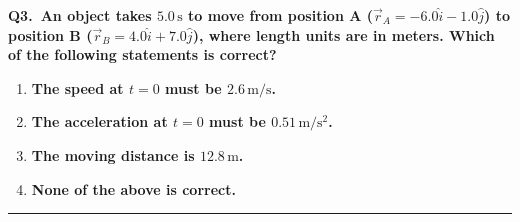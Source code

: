\documentclass[11pt]{article}
\newcommand{\QuestionStyle}[1]{{\large\bfseries\boldmath #1}}
\newcommand{\AnswerStyle}[1]{{\large\bfseries\boldmath #1}}
\newcommand{\ReasonStyle}[1]{{\normalsize #1}}
\newif\ifshowreason
\newcommand{\Correct}[2]{%
  \item \AnswerStyle{\textcolor{AnsRed}{#1}}%
  \ifshowreason\\[-0.2em]
    \ReasonStyle{\textcolor{AnsRed}{#2}}%
  \fi
}
\newcommand{\Wrong}[2]{%
  \item \AnswerStyle{\textcolor{WrongBlue}{#1}}%
  \ifshowreason\\[-0.2em]
    \ReasonStyle{\textcolor{WrongBlue}{#2}}%
  \fi
}
\newcommand{\QBlock}[3]{%
  \Needspace{8\baselineskip}%
  \noindent
  \begin{minipage}{\linewidth}
    \QuestionStyle{#1.~#2}

    \vspace{0.25em}
    \begin{enumerate}
      #3
    \end{enumerate}

    \vspace{0.25em}
    \hrule height 0.4pt
  \end{minipage}
  \vspace{0.75em}
}
\begin{document}
\QBlock{Q3}{An object takes $5.0\,\mathrm{s}$ to move from position A ($\vec{r}_A=-6.0\hat{i}-1.0\hat{j}$) to position B ($\vec{r}_B=4.0\hat{i}+7.0\hat{j}$), where length units are in meters. Which of the following statements is correct?}{
  \Wrong{The speed at $t=0$ must be $2.6\,\mathrm{m/s}$.}{This confuses an average rate (like $|\Delta\vec r|/\Delta t$) with the instantaneous speed at $t=0$. Many different motions can connect the same endpoints in $5.0$ s with different initial speeds.}
  \Wrong{The acceleration at $t=0$ must be $0.51\,\mathrm{m/s^2}$.}{With only two position vectors and a total time, the acceleration at a specific time is not uniquely determined. A numerical value like $0.51\,\mathrm{m/s^2}$ would require extra assumptions (e.g., constant acceleration and more data).}
  \Correct{The moving distance is $12.8\,\mathrm{m}$.}{Compute the displacement: $\Delta\vec r=\vec r_B-\vec r_A=(4-(-6))\hat i+(7-(-1))\hat j=10\hat i+8\hat j$. Its magnitude is $|\Delta\vec r|=\sqrt{10^2+8^2}=\sqrt{164}\approx 12.8\,\mathrm{m}$, so this statement matches the straight-line separation between A and B.}
  \Wrong{None of the above is correct.}{Option C is correct because the magnitude of the displacement between the given positions is about $12.8\,\mathrm{m}$. Therefore it is not true that none of the statements are correct.}
}
\end{document}
